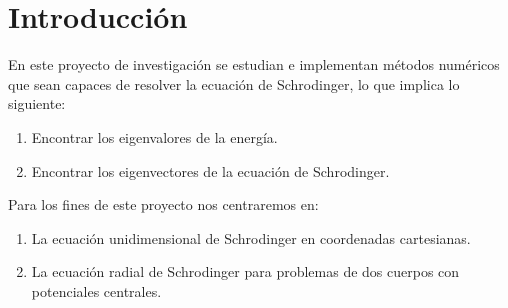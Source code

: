 \section{Introducción}

\begin{frame}{}
    \begin{tcolorbox}[colback=blue!5!white, colframe =blue!75!black, title=Introducción]
        
        En este proyecto de investigación se estudian e implementan métodos numéricos que sean capaces de resolver la ecuación de Schrodinger, lo que implica lo siguiente:

        \begin{enumerate}
            \item Encontrar los eigenvalores de la energía.
            \item Encontrar los eigenvectores de la ecuación de Schrodinger.
        \end{enumerate}

        Para los fines de este proyecto nos centraremos en:

        \begin{enumerate}
            \item La ecuación unidimensional de Schrodinger en coordenadas cartesianas.
            \item La ecuación radial de Schrodinger para problemas de dos cuerpos con potenciales centrales.
        \end{enumerate}

    \end{tcolorbox}
\end{frame}
